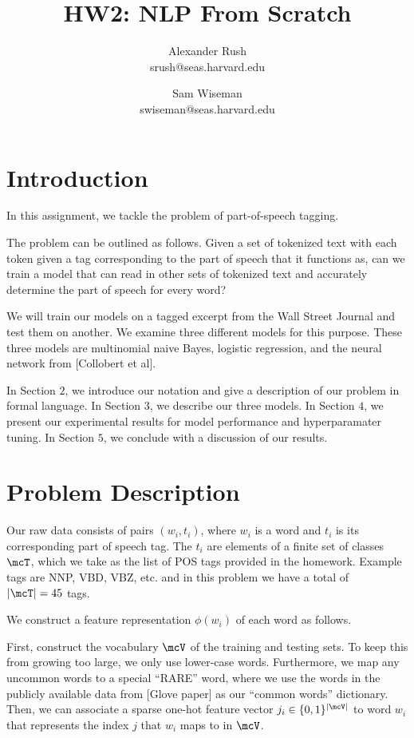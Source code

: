\documentclass[11pt]{article}
\title{HW2: NLP From Scratch}
\author{Alexander Rush \\ srush@seas.harvard.edu \and Sam Wiseman \\ swiseman@seas.harvard.edu }
\begin{document}
\maketitle{}
\section{Introduction}

In this assignment, we tackle the problem of part-of-speech tagging. 

The problem can be outlined as follows. Given a set of tokenized text with each token given a tag corresponding to the part of speech that it functions as, can we train a model that can read in other sets of tokenized text and accurately determine the part of speech for every word? 

We will train our models on a tagged excerpt from the Wall Street Journal and test them on another. We examine three different models for this purpose. These three models are multinomial naive Bayes, logistic regression, and the neural network from [Collobert et al]. 

In Section $2$, we introduce our notation and give a description of our problem in formal language. In Section $3$, we describe our three models. In Section $4$, we present our experimental results for model performance and hyperparamater tuning. In Section $5$, we conclude with a discussion of our results. 

\section{Problem Description}

Our raw data consists of pairs $(w_i, t_i)$, where $w_i$ is a word and $t_i$ is its corresponding part of speech tag. The $t_i$ are elements of a finite set of classes $\mcT$, which we take as the list of POS tags provided in the homework. Example tags are NNP, VBD, VBZ, etc. and in this problem we have a total of $|\mcT| = 45$ tags.

We construct a feature representation $\phi(w_i)$ of each word as follows. 

First, construct the vocabulary $\mcV$ of the training and testing sets. To keep this from growing too large, we only use lower-case words. Furthermore, we map any uncommon words to a special ``RARE'' word, where we use the words in the publicly available data from [Glove paper] as our ``common words'' dictionary. Then, we can associate a sparse one-hot feature vector $j_i \in \{0,1\}^{|\mcV|}$ to word $w_i$ that represents the index $j$ that $w_i$ maps to in $\mcV$.
\end{document}
